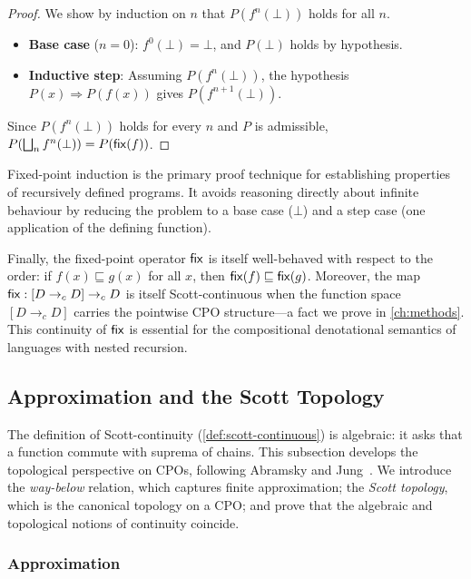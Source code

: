 \begin{proof}
We show by induction on $n$ that $P(f^n(\bot))$ holds for all $n$.
\begin{itemize}
  \item \textbf{Base case} ($n = 0$): $f^0(\bot) = \bot$, and $P(\bot)$
        holds by hypothesis.
  \item \textbf{Inductive step}: Assuming $P(f^n(\bot))$, the hypothesis
        $P(x) \Rightarrow P(f(x))$ gives $P(f^{n+1}(\bot))$.
\end{itemize}
Since $P(f^n(\bot))$ holds for every $n$ and $P$ is admissible,
$P(\bigsqcup_n f^n(\bot)) = P(\mathsf{fix}(f))$.
\end{proof}

Fixed-point induction is the primary proof technique for establishing
properties of recursively defined programs. It avoids reasoning directly
about infinite behaviour by reducing the problem to a base case ($\bot$)
and a step case (one application of the defining function).

Finally, the fixed-point operator $\mathsf{fix}$ is itself well-behaved with
respect to the order: if $f(x) \sqsubseteq g(x)$ for all $x$, then
$\mathsf{fix}(f) \sqsubseteq \mathsf{fix}(g)$. Moreover, the map
$\mathsf{fix} : [D \to_{c} D] \to_{c} D$ is itself Scott-continuous when the function
space $[D \to_{c} D]$ carries the pointwise CPO structure---a fact we prove
in \cref{ch:methods}. This continuity of $\mathsf{fix}$ is essential for the
compositional denotational semantics of languages with nested recursion.

\subsection{Approximation and the Scott Topology}
\label{sec:bg-scott-topology}

The definition of Scott-continuity (\cref{def:scott-continuous}) is
algebraic: it asks that a function commute with suprema of chains. This
subsection develops the topological perspective on CPOs, following
Abramsky and Jung~\cite[\S1.2, \S4.2--4.3]{AJ1994}. We introduce the
\emph{way-below} relation, which captures finite approximation; the
\emph{Scott topology}, which is the canonical topology on a CPO; and
prove that the algebraic and topological notions of continuity coincide.

\subsubsection*{Approximation}

